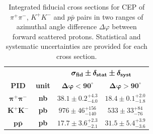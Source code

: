 {
\renewcommand{\arraystretch}{1.5}
\begin{table}[]\centering
\begin{tabular}{cc c c}
~ & ~ & \multicolumn{2}{c}{$\bm{ \sigma_{\text{\bf{fid}}} \pm \delta_{\text{\bf{stat}}} \pm \delta_{\text{\bf{syst}}}}$} \\
 \bf{PID} & \bf{unit} & $\bm{\Delta\varphi<90^{\circ}}$ & $\bm{\Delta\varphi>90^{\circ}}$ \\ \hline\hline
 $\bm{\pi^{+}\pi^{-}}$ & \bf{nb} & $38.1\pm0.2^{+4.3}_{-4.0}$ & $18.4\pm0.1^{+2.0}_{-1.8}$ \\ %
 $\bm{K^{+}K^{-}}$ & \bf{pb} & $976\pm46^{+156}_{-140}$ & $533\pm33^{+84}_{-76}$ \\ %
 $\bm{p\bar{p}}$ & \bf{pb} & $17.7\pm3.6^{+2.3}_{-2.1}$ & $31.5\pm5.4^{+3.9}_{-3.6}$\\ %
\end{tabular}
\caption{Integrated fiducial cross sections for CEP of $\pi^{+}\pi^{-}$, $K^{+}K^{-}$ and $p\bar{p}$ pairs in two ranges of azimuthal angle difference $\Delta\varphi$ between forward scattered protons. Statistical and systematic uncertainties are provided for each cross section.}\label{tab:xSec}
\end{table}
}



